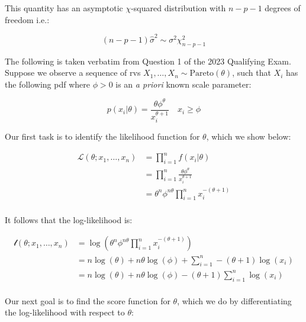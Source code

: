 \documentclass{report}
\begin{document}
This quantity has an asymptotic $\chi$-squared distribution with $n - p - 1$ degrees of freedom i.e.:

\begin{equation}\label{eq:ex-ols-sigma-squared-unbiased-asymptotics}
    (n - p - 1)\hat{\sigma}^2 \sim \sigma^2\chi^2_{n-p-1}
\end{equation}

The following is taken verbatim from Question 1 of the 2023 Qualifying Exam. Suppose we observe a sequence of \glspl{rv} $X_1, \dots, X_n \sim \text{Pareto}(\theta)$, such that $X_i$ has the following \gls{pdf} where $\phi > 0$ is an \textit{a priori} known scale parameter:

\begin{equation}\label{eq:ex-ols-pareto-pdf}
    p(x_i|\theta) = \frac{\theta\phi^\theta}{x_i^{\theta+1}} \quad x_i \geq \phi
\end{equation}

Our first task is to identify the likelihood function for $\theta$, which we show below:

\begin{equation}\label{eq:ex-ols-pareto-likelihood}
    \begin{aligned}
        \mathcal{L}(\theta; x_1, \dots, x_n)
          &= \prod_{i=1}^n f(x_i|\theta) \\
          &= \prod_{i=1}^n \frac{\theta\phi^\theta}{x_i^{\theta+1}} \\
          &= \theta^n\phi^{n\theta} \prod_{i=1}^n x_i^{-(\theta + 1)} \\
    \end{aligned}
\end{equation}

It follows that the log-likelihood is:

\begin{equation}\label{eq:ex-ols-pareto-log-likelihood}
    \begin{aligned}
        \mathcal{l}(\theta; x_1, \dots, x_n)
          &= \log\left(\theta^n\phi^{n\theta} \prod_{i=1}^n x_i^{-(\theta + 1)}\right) \\
          &= n\log(\theta) + n\theta\log(\phi) + \sum_{i=1}^n -(\theta + 1)\log(x_i) \\
          &= n\log(\theta) + n\theta\log(\phi) -(\theta + 1) \sum_{i=1}^n \log(x_i) \\
    \end{aligned}
\end{equation}

Our next goal is to find the score function for $\theta$, which we do by differentiating the log-likelihood with respect to $\theta$:
\end{document}
